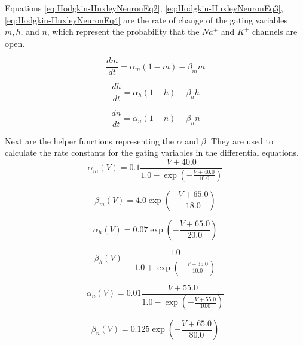 	
	
	
	
			\begin{multicols}{2}
			
				\par Equations \ref{eq:Hodgkin-HuxleyNeuronEq2}, \ref{eq:Hodgkin-HuxleyNeuronEq3}, \ref{eq:Hodgkin-HuxleyNeuronEq4} are the rate of change of the gating variables $m, h$, and $n$, which represent the probability that the $Na^+$ and $K^+$ channels are open. \newline		
	
			\columnbreak
	
				\begin{equation}
					\label{eq:Hodgkin-HuxleyNeuronEq2}
					\frac{dm}{dt} = \alpha_m (1 - m) - \beta_m m
				\end{equation}
			
				\begin{equation}
					\label{eq:Hodgkin-HuxleyNeuronEq3}
					\frac{dh}{dt} = \alpha_h (1 - h) - \beta_h h
				\end{equation}
			
				\begin{equation}
					\label{eq:Hodgkin-HuxleyNeuronEq4}
					\frac{dn}{dt} = \alpha_n (1 - n) - \beta_n n
				\end{equation}
			
			\end{multicols}
			
			
			\begin{multicols}{2}
				\par Next are the helper functions representing the $\alpha$ and $\beta$. They are used to calculate the rate constants for the gating variables in the differential equations.	
			\columnbreak
				\begin{equation}
					\alpha_m(V) = 0.1 \frac{V + 40.0}{1.0 - \exp\left(-\frac{V + 40.0}{10.0}\right)}
				\end{equation}
			
				\begin{equation}
					\beta_m(V) = 4.0 \exp\left(-\frac{V + 65.0}{18.0}\right)
				\end{equation}
			
				\begin{equation}
					\alpha_h(V) = 0.07 \exp\left(-\frac{V + 65.0}{20.0}\right)
				\end{equation}
			
				\begin{equation}
					\beta_h(V) = \frac{1.0}{1.0 + \exp\left(-\frac{V + 35.0}{10.0}\right)}
				\end{equation}
			
				\begin{equation}
					\alpha_n(V) = 0.01 \frac{V + 55.0}{1.0 - \exp\left(-\frac{V + 55.0}{10.0}\right)}
				\end{equation}
		
				\begin{equation}
					\beta_n(V) = 0.125 \exp\left(-\frac{V + 65.0}{80.0}\right)
				\end{equation}
			\end{multicols}
			
			
